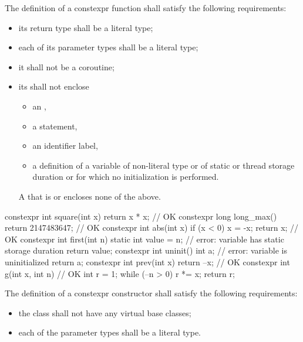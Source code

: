 \pnum
{}
The definition of a constexpr function shall satisfy the following
requirements:

\begin{itemize}
\item
its return type shall be a literal type;

\item
each of its parameter types shall be a literal type;

\item
it shall not be a coroutine;

\item
its  shall not enclose
\begin{itemize}
\item an ,
\item a  statement,
\item an identifier label,
\item a definition of a variable
of non-literal type or
of static or thread storage duration or
for which no initialization is performed.
\end{itemize}
\begin{note}
A  that is  or 
encloses none of the above.
\end{note}
\end{itemize}

\begin{example}
\begin{codeblock}
constexpr int square(int x)
  { return x * x; }             // OK
constexpr long long_max()
  { return 2147483647; }        // OK
constexpr int abs(int x) {
  if (x < 0)
    x = -x;
  return x;                     // OK
}
constexpr int first(int n) {
  static int value = n;         // error: variable has static storage duration
  return value;
}
constexpr int uninit() {
  int a;                        // error: variable is uninitialized
  return a;
}
constexpr int prev(int x)
  { return --x; }               // OK
constexpr int g(int x, int n) { // OK
  int r = 1;
  while (--n > 0) r *= x;
  return r;
}
\end{codeblock}
\end{example}

\pnum
{}%
The definition of a constexpr constructor shall satisfy the
following requirements:
\begin{itemize}
\item
the class shall not have any virtual base classes;

\item
each of the parameter types shall be a literal type.
\end{itemize}


